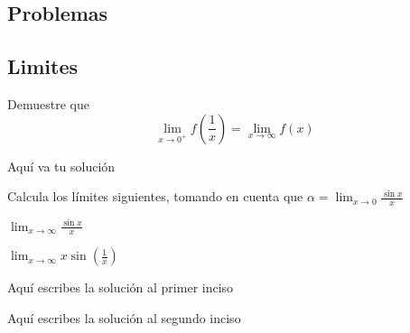 \begin{center} \section{Problemas} \end{center}

\subsection{Limites}

\begin{problema}
    Demuestre que $$\lim_{x \rightarrow 0^+}f\left(\frac{1}{x}\right) = \lim_{x \rightarrow \infty}f(x)$$
\end{problema}

\begin{respuesta}
    Aquí va tu solución 
\end{respuesta}

\begin{problema}
    Calcula los límites siguientes, tomando en cuenta que $\alpha = \lim_{x \rightarrow 0} \frac{\sin x}{x}$
    
    \begin{subproblema}
        $\lim_{x \rightarrow \infty} \frac{\sin x}{x}$
    \end{subproblema}
    
    \begin{subproblema}
        $\lim_{x \rightarrow \infty} x \sin(\frac{1}{x})$
    \end{subproblema}
    
\end{problema}

\begin{respuesta}
    
    \begin{subrespuesta}
        Aquí escribes la solución al primer inciso
    \end{subrespuesta}
    
    \begin{subrespuesta}
        Aquí escribes la solución al segundo inciso
    \end{subrespuesta}
     
\end{respuesta}